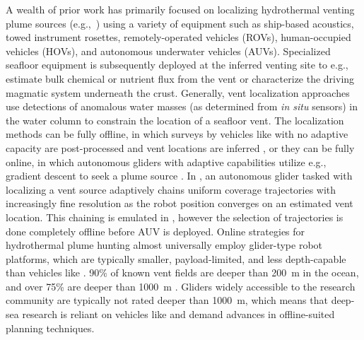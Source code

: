 A wealth of prior work has primarily focused on localizing hydrothermal venting plume sources (e.g.,~\cite{jakuba2007stochastic, mcgill2011robot, nakamura2013discovery, paduan2018discovery, mason2020evaluation, wang20203, kim2020discovery,ferri2010novel}) using a variety of equipment such as ship-based acoustics, towed instrument rosettes, remotely-operated vehicles (ROVs), human-occupied vehicles (HOVs), and autonomous underwater vehicles (AUVs). Specialized seafloor equipment is subsequently deployed at the inferred venting site to e.g., estimate bulk chemical or nutrient flux from the vent or characterize the driving magmatic system underneath the crust. Generally, vent localization approaches use detections of anomalous water masses (as determined from \emph{in situ} sensors) in the water column to constrain the location of a seafloor vent. The localization methods can be fully offline, in which surveys by vehicles like \Sentry with no adaptive capacity are post-processed and vent locations are inferred \autocite{jakuba2007stochastic,nakamura2013discovery}, or they can be fully online, in which autonomous gliders with adaptive capabilities utilize e.g., gradient descent to seek a plume source \autocite{wang20203}. In \autocite{branch2020demonstration}, an autonomous glider tasked with localizing a vent source adaptively chains uniform coverage trajectories with increasingly fine resolution as the robot position converges on an estimated vent location. This chaining is emulated in \PHORTEX, however the selection of trajectories is done completely offline before AUV \Sentry is deployed. Online strategies for hydrothermal plume hunting almost universally employ glider-type robot platforms, which are typically smaller, payload-limited, and less depth-capable than vehicles like \Sentry. 90\% of known vent fields are deeper than \SI{200}{\meter} in the ocean, and over 75\% are deeper than \SI{1000}{\meter} \autocite{beaulieu2013authoritative}. Gliders widely accessible to the research community are typically not rated deeper than \SI{1000}{\meter}, which means that deep-sea research is reliant on vehicles like \Sentry and demand advances in offline-suited planning techniques.

